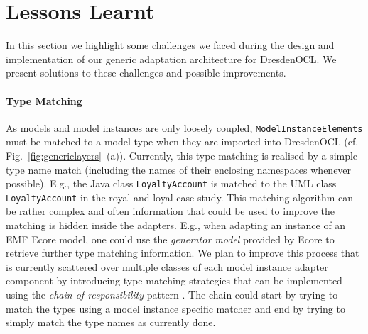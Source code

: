 \section{Lessons Learnt}
\label{sec:lessons}

  In this section we highlight some challenges we faced during the design
  and implementation of our generic adaptation architecture for DresdenOCL.
  We present solutions to these challenges and possible improvements.

	\paragraph{Type Matching}
	As models and model instances are only loosely 
	coupled, \texttt{Model\-Instance\-Elements} must be matched to a model type
	when they are imported into DresdenOCL (cf. Fig.~\ref{fig:genericlayers}~(a)). 
	Currently, this type matching is realised by a simple type name match (including the names of 
	their enclosing namespaces whenever possible). E.g., the Java class \texttt{Loyalty\-Account} is
	matched to the UML class \texttt{Loyalty\-Account} in the royal and loyal case study.
	This matching algorithm can be rather complex and often information that could be 
	used to improve the matching is hidden inside the adapters. E.g., when adapting an instance of an EMF 
	Ecore model, one could use the \emph{generator model} provided by Ecore to
	retrieve further type matching information. We plan to improve this process
	that is currently scattered over multiple classes of each model instance 
	adapter component by introducing type matching strategies that 
	can be implemented using the \emph{chain of responsibility} 
	pattern \cite{gamma:dp}. The chain could start by trying to match the 
	types using a model instance specific matcher and end by trying to 
	simply match the type names as currently done.
	
